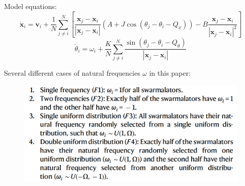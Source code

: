 \documentclass[10pt,aspectratio=43,mathserif,table]{beamer}
\begin{document}
\begin{frame}
    Model equations:
    $$
    \dot{\mathbf{x}}_i=\mathbf{v}_i+\frac{1}{N}\sum_{j\ne i}^N{\left[ \frac{\mathbf{x}_j-\mathbf{x}_i}{\left| \mathbf{x}_j-\mathbf{x}_i \right|}\left( A+J\cos \left( \theta _j-\theta _i-Q_{\dot{x}} \right) \right) -B\frac{\mathbf{x}_j-\mathbf{x}_i}{\left| \mathbf{x}_j-\mathbf{x}_i \right|^2} \right]}
    $$
    $$
    \dot{\theta}_i=\omega _i+\frac{K}{N}\sum_{j\ne i}^N{\frac{\sin \left( \theta _j-\theta _i-Q_{\dot{\theta}} \right)}{\left| \mathbf{x}_j-\mathbf{x}_i \right|}}
    $$
\end{frame}

\begin{frame}
    Several different cases of natural frequencies $\omega$ in this paper:
    \begin{figure}
        \centering
        \includegraphics[width=\textwidth]{omega.jpg}
    \end{figure}
\end{frame}
\end{document}
